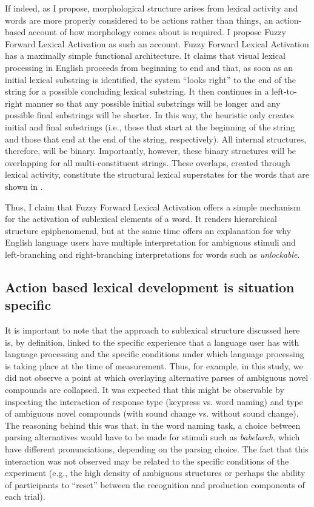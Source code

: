 \documentclass[output=paper]{langsci/langscibook}
\begin{document}
If indeed, as I propose, morphological structure arises from lexical activity and words are more properly considered to be actions rather than things, an action-based account of how morphology comes about is required. I propose Fuzzy Forward Lexical Activation as such an account. Fuzzy Forward Lexical Activation has a maximally simple functional architecture. It claims that visual lexical processing in English proceeds from beginning to end and that, as soon as an initial lexical substring is identified, the system ``looks right'' to the end of the string for a possible concluding lexical substring.  It then continues in a left-to-right manner so that any possible initial substrings will be longer and any possible final substrings will be shorter. In this way, the heuristic only creates initial and final substrings (i.e., those that start at the beginning of the string and those that end at the end of the string, respectively).  All internal structures, therefore, will be binary.  Importantly, however, these binary structures will be overlapping for all multi-constituent strings.  These overlaps, created through lexical activity, constitute the structural lexical superstates for the words that are shown in .

Thus, I claim that Fuzzy Forward Lexical Activation offers a simple mechanism for the activation of sublexical elements of a word. It renders hierarchical structure epiphenomenal, but at the same time offers an explanation for why English language users have multiple interpretation for ambiguous stimuli and left-branching and right-branching interpretations for words such as \textit{unlockable}.

\subsection{Action based lexical development is situation specific}\label{sec:libben:4.3}

It is important to note that the approach to sublexical structure discussed here is, by definition, linked to the specific experience that a language user has with language processing and the specific conditions under which language processing is taking place at the time of measurement.  Thus, for example, in this study, we did not observe a point at which overlaying alternative parses of ambiguous novel compounds are collapsed. It was expected that this might be observable by inspecting the interaction of response type (keypress vs. word naming) and type of ambiguous novel compounds (with sound change vs. without sound change). The reasoning behind this was that, in the word naming task, a choice between parsing alternatives would have to be made for stimuli such as \textit{babelarch}, which have different pronunciations, depending on the parsing choice.  The fact that this interaction was not observed may be related to the specific conditions of the experiment (e.g., the high density of ambiguous structures or perhaps the ability of participants to ``reset'' between the recognition and production components of each trial).
\end{document}
